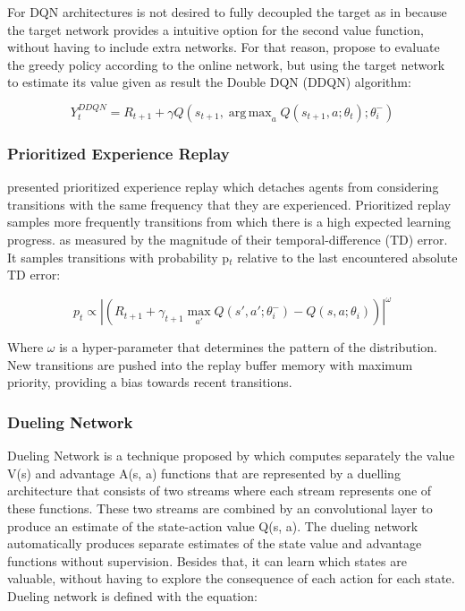 \documentclass{llncs}
\DeclareMathOperator*{\argmax}{arg\,max}
\begin{document}
	For DQN architectures is not desired to fully decoupled the target  as in \cite{Hasselt2010} because the target network provides a intuitive option for the second value function, without having to include extra networks. For that reason, \cite{Hasselt:2016:DRL:3016100.3016191} propose to evaluate the greedy policy according to the online network, but using the target network to estimate its value given as result the Double DQN (DDQN) algorithm:
	
\begin{equation}
Y_{t}^{DDQN} = R_{t+1} + \gamma Q(s_{t+1}, \argmax_{a} Q(s_{t+1}, a;\theta_{t});\theta_{i}^{-})
\end{equation}

\subsubsection{Prioritized Experience Replay}

\cite{SchaulQAS15} presented prioritized experience replay which detaches agents from considering transitions with the same frequency that they are experienced. Prioritized replay samples more frequently transitions from which there is a high expected learning progress. as measured by the magnitude of their temporal-difference (TD) error. It samples transitions with probability p$_{t}$ relative to the last encountered absolute TD error:
	
\begin{equation}
p_{t} \propto \left|\left(R_{t+1} + \gamma_{t+1} \max_{a'}Q\left(s',a';\theta_{i}^{-}\right) - Q\left(s,a;\theta_{i}\right)\right)\right|^{\omega}
\end{equation}

Where $\omega$ is a hyper-parameter that determines the pattern of the distribution. New transitions are pushed into the replay buffer memory with maximum priority, providing a bias towards recent transitions.

\subsubsection{Dueling Network}\label{duelingNet}

Dueling Network is a technique proposed by \cite{Wang2016} which computes separately the value V(s) and advantage A(s, a) functions that are represented by a duelling architecture that consists of two streams where each stream represents one of these functions. These two streams are combined by an convolutional layer to produce an estimate of the state-action value Q(s, a). The dueling network automatically produces separate estimates of the state value and advantage functions without supervision. Besides that, it can learn which states are valuable, without having to explore the consequence of each action for each state. Dueling network is defined with the equation:
\end{document}
